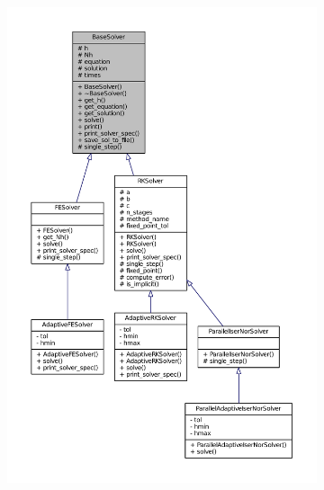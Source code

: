 \documentclass{beamer}
\begin{document}
\begin{frame}
\begin{figure}
\begin{subfigure}{.5\textwidth}
			\includegraphics[width=\linewidth]{etc/classes_full.pdf} %
		\end{subfigure}
	\end{figure}
\end{frame}
\end{document}
